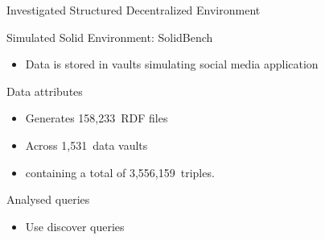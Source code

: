 \begin{frame}{Investigated Structured Decentralized Environment}
  \begin{block}{Simulated Solid Environment: SolidBench \parencite{taelman2023link}}
    \begin{itemize}
        \item Data is stored in vaults simulating social media application
    \end{itemize}
  \end{block}
  \begin{block}{Data attributes}
        \begin{itemize}
            \item Generates 158,233~RDF files 
            \item Across 1,531~data vaults
            \item containing a total of 3,556,159~triples.
    \end{itemize}
  \end{block}
  \begin{block}{Analysed queries}
        \begin{itemize}
        \item Use discover queries
    \end{itemize}
  \end{block}
\end{frame}

